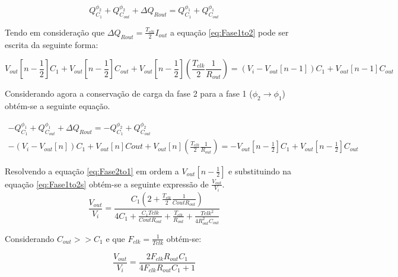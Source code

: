 \documentclass[12pt]{article}
\begin{document}
{\footnotesize\begin{equation}
\label{eq:Fase1to2}
Q^{\phi_2}_{C_1} + Q^{\phi_2}_{C_{out}} + \Delta Q_{Rout} = Q^{\phi_1}_{C_1} + Q^{\phi_1}_{C_{out}} 
\end{equation}}
\vspace{5mm}

Tendo em consideração que $\Delta Q_{Rout} = \frac{T_{clk} }{2}I_{out}$ a equação \ref{eq:Fase1to2} pode ser escrita da seguinte forma:

{\footnotesize\begin{equation}
\label{eq:Fase1to2s}
V_{out}[n-\frac{1}{2}]C_1 + V_{out}[n-\frac{1}{2}]C_{out} +  V_{out}[n-\frac{1}{2}](\frac{T_{clk} }{2}\frac{1}{R_{out}})=(V_i-V_{out}[n-1])C_1 + V_{out}[n-1]C_{out}
\end{equation}}
\vspace{5mm}

Considerando agora a conservação de carga da fase 2 para a fase 1 ($\phi_2 \rightarrow \phi_1$) obtém-se a seguinte equação.


{\footnotesize \begin{equation}
  \begin{array}{ccc}
  -Q^{\phi_1}_{C_1} + Q^{\phi_1}_{C_{out}} + \Delta Q_{Rout} = -Q^{\phi_2}_{C_1} + Q^{\phi_2}_{C_{out}} \\[1em]
  -(V_i-V_{out}[n])C_1+V_{out}[n]C{out}+V_{out}[n](\frac{T_{clk} }{2}\frac{1}{R_{out}}) = - V_{out}[n-\frac{1}{2}]C_1+V_{out}[n-\frac{1}{2}]C_{out} 
   \end{array}
   \label{eq:Fase2to1}
\end{equation}}
\vspace{5mm} 

Resolvendo a equação \ref{eq:Fase2to1} em ordem a $V_{out}[n-\frac{1}{2}]$ e substituindo na equação \ref{eq:Fase1to2s} obtém-se a seguinte expressão de $\frac{V_{out}}{V_i}$.
{\footnotesize\begin{equation}
\label{eq:Buck(vo/vi)}
\frac{V_{out}}{V_i} = \frac{C_1(2 + \frac{T_{clk}}{2}\frac{1}{C{out}R_{out}})}{4C_1+ \frac{C_1T{clk}}{C{out}R_{out}} +  \frac{T_{clk}}{R_{out}} + \frac{T{clk}^2}{4R_{out}^2C_{out}} }
\end{equation}}
\vspace{5mm} 

Considerando $C_{out}>> C_1$ e que $F_{clk} = \frac{1}{T{clk}}$ obtém-se:
\vspace{5mm}     

{\footnotesize\begin{equation}
\label{eq:Buck(vo/vi)ap}
\frac{V_{out}}{V_i} = \frac{2F_{clk}R_{out}C_1}{4F_{clk}R_{out}C_1+ 1}
\end{equation}}
\vspace{5mm}  
\end{document}
